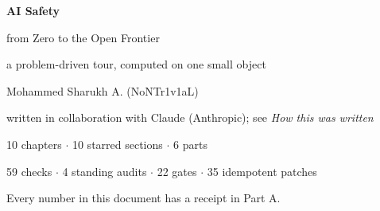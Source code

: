 \documentclass[11pt,oneside,a4paper]{book}
\begin{document}
\begin{titlepage}
\centering
\vspace*{4cm}
{\Huge\bfseries AI Safety\par}
\vspace{6mm}
{\LARGE from Zero to the Open Frontier\par}
\vspace{18mm}
{\large a problem-driven tour, computed on one small object\par}
\vspace{16mm}
{\large Mohammed Sharukh A. (NoNTr1v1aL)\par}
\vspace{2mm}
{\small written in collaboration with Claude (Anthropic); see \emph{How this was written}\par}
\vfill
{\normalsize 10 chapters $\cdot$ 10 starred sections $\cdot$ 6 parts\par}
{\normalsize 59 checks $\cdot$ 4 standing audits $\cdot$ 22 gates $\cdot$ 35 idempotent patches\par}
\vspace{10mm}
{\small Every number in this document has a receipt in Part A.\par}
\vspace*{2cm}
\end{titlepage}

{\setlength{\parskip}{0pt}\tableofcontents}
\clearpage


\end{document}
